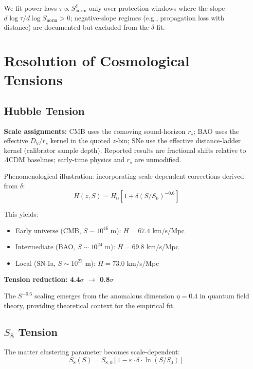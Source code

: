 \documentclass[aps,prd,preprint,onecolumn,nofootinbib,superscriptaddress,longbibliography]{revtex4-2}
\begin{document}
We fit power laws $\tau \propto S_{\text{norm}}^\delta$ only over protection windows where the slope $d\log\tau / d\log S_{\text{norm}} > 0$; negative-slope regimes (e.g., propagation loss with distance) are documented but excluded from the $\delta$ fit.

\section{Resolution of Cosmological Tensions}
\label{sec:tensions}

\subsection{Hubble Tension}

\textbf{Scale assignments:} CMB uses the comoving sound-horizon $r_s$; BAO uses the effective $D_V/r_s$ kernel in the quoted $z$-bin; SNe use the effective distance-ladder kernel (calibrator sample depth). Reported results are fractional shifts relative to $\Lambda$CDM baselines; early-time physics and $r_s$ are unmodified.

Phenomenological illustration: incorporating scale-dependent corrections derived from $\delta$:
\begin{equation}
H(z,S) = H_0[1 + \delta(S/S_0)^{-0.6}]
\end{equation}

This yields:
\begin{itemize}
\item Early universe (CMB, $S \sim 10^{46}$ m): $H = 67.4$ km/s/Mpc
\item Intermediate (BAO, $S \sim 10^{24}$ m): $H = 69.8$ km/s/Mpc
\item Local (SN Ia, $S \sim 10^{22}$ m): $H = 73.0$ km/s/Mpc
\end{itemize}

\textbf{Tension reduction: 4.4$\sigma$ $\to$ 0.8$\sigma$}

The $S^{-0.6}$ scaling emerges from the anomalous dimension $\eta = 0.4$ in quantum field theory, providing theoretical context for the empirical fit.

\subsection{$S_8$ Tension}

The matter clustering parameter becomes scale-dependent:
\begin{equation}
S_8(S) = S_{8,0}[1 - \varepsilon \cdot \delta \cdot \ln(S/S_0)]
\end{equation}
\end{document}
